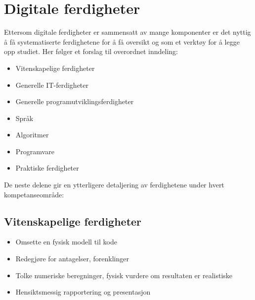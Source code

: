 \section{Digitale ferdigheter}

Ettersom digitale ferdigheter er sammensatt av mange komponenter er det nyttig å få systematiserte ferdighetene for å få oversikt og som et verktøy for å legge opp studiet. Her følger et forslag til overordnet inndeling:

\begin{itemize}
	\item Vitenskapelige ferdigheter
	\item Generelle IT-ferdigheter
	\item Generelle programutviklingsferdigheter
	\item Språk
	\item Algoritmer
	\item Programvare
	\item Praktiske ferdigheter
\end{itemize}

De neste delene gir en ytterligere detaljering av ferdighetene under hvert kompetanseområde:

\subsection{Vitenskapelige ferdigheter}
\begin{itemize}
	\item Omsette en fysisk modell til kode
	\item Redegjøre for antagelser, forenklinger
	\item Tolke numeriske beregninger, fysisk vurdere om resultaten er realistiske
	\item Hensiktsmessig rapportering og presentasjon
\end{itemize}

